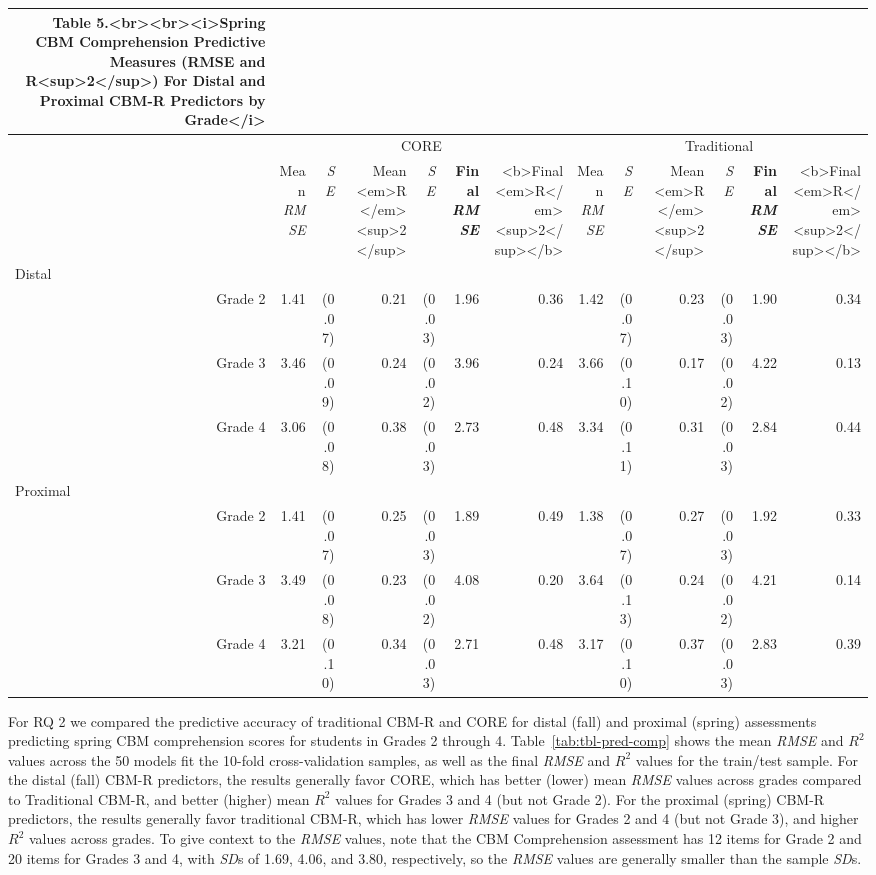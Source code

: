 \documentclass[
  english,
  man, fleqn, noextraspace]{apa6}
\begin{document}
\captionsetup[table]{labelformat=empty,skip=1pt}
\begin{longtable}{rrrrrrrrrrrrr}
\caption*{
\large Table 5.<br><br><i>Spring CBM Comprehension Predictive Measures (RMSE and R<sup>2</sup>) For Distal and Proximal CBM-R Predictors by Grade</i>\\ 
} \\ 
\toprule
& \multicolumn{6}{c}{CORE} & \multicolumn{6}{c}{Traditional} \\ 
 \cmidrule(lr){2-7}\cmidrule(lr){8-13}
 & Mean \emph{RMSE} & \emph{SE} & Mean <em>R</em><sup>2</sup> & \emph{SE} & \textbf{Final \emph{RMSE}} & <b>Final <em>R</em><sup>2</sup></b> & Mean \emph{RMSE} & \emph{SE} & Mean <em>R</em><sup>2</sup> & \emph{SE} & \textbf{Final \emph{RMSE}} & <b>Final <em>R</em><sup>2</sup></b> \\ 
\midrule
\multicolumn{1}{l}{Distal} \\ 
\midrule
Grade 2 & 1.41 & (0.07) & 0.21 & (0.03) & 1.96 & 0.36 & 1.42 & (0.07) & 0.23 & (0.03) & 1.90 & 0.34 \\ 
Grade 3 & 3.46 & (0.09) & 0.24 & (0.02) & 3.96 & 0.24 & 3.66 & (0.10) & 0.17 & (0.02) & 4.22 & 0.13 \\ 
Grade 4 & 3.06 & (0.08) & 0.38 & (0.03) & 2.73 & 0.48 & 3.34 & (0.11) & 0.31 & (0.03) & 2.84 & 0.44 \\ 
\midrule
\multicolumn{1}{l}{Proximal} \\ 
\midrule
Grade 2 & 1.41 & (0.07) & 0.25 & (0.03) & 1.89 & 0.49 & 1.38 & (0.07) & 0.27 & (0.03) & 1.92 & 0.33 \\ 
Grade 3 & 3.49 & (0.08) & 0.23 & (0.02) & 4.08 & 0.20 & 3.64 & (0.13) & 0.24 & (0.02) & 4.21 & 0.14 \\ 
Grade 4 & 3.21 & (0.10) & 0.34 & (0.03) & 2.71 & 0.48 & 3.17 & (0.10) & 0.37 & (0.03) & 2.83 & 0.39 \\ 
\bottomrule
\end{longtable}

For RQ 2 we compared the predictive accuracy of traditional CBM-R and CORE for distal (fall) and proximal (spring) assessments predicting spring CBM comprehension scores for students in Grades 2 through 4. Table~\ref{tab:tbl-pred-comp} shows the mean \emph{RMSE} and \(R^2\) values across the 50 models fit the 10-fold cross-validation samples, as well as the final \emph{RMSE} and \(R^2\) values for the train/test sample. For the distal (fall) CBM-R predictors, the results generally favor CORE, which has better (lower) mean \emph{RMSE} values across grades compared to Traditional CBM-R, and better (higher) mean \(R^2\) values for Grades 3 and 4 (but not Grade 2). For the proximal (spring) CBM-R predictors, the results generally favor traditional CBM-R, which has lower \emph{RMSE} values for Grades 2 and 4 (but not Grade 3), and higher \(R^2\) values across grades. To give context to the \emph{RMSE} values, note that the CBM Comprehension assessment has 12 items for Grade 2 and 20 items for Grades 3 and 4, with \emph{SD}s of 1.69, 4.06, and 3.80, respectively, so the \emph{RMSE} values are generally smaller than the sample \emph{SD}s.
\end{document}
